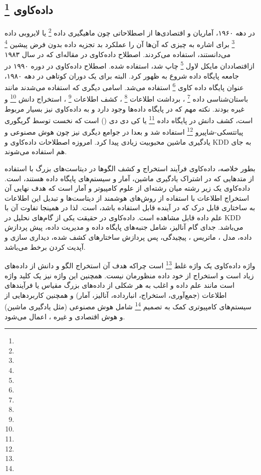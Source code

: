 \documentclass[a4paper, 12pt]{article}
\begin{document}
 \subsection*{داده‌کاوی
\footnote{} 
} 
در دهه ۱۹۶۰، آماریان و اقتصادی‌ها از اصطلاحاتی چون ماهیگیری داده 
\footnote{}
یا لایروبی داده
\footnote{}
برای اشاره به چیزی که آن‌ها آن‌ را عملکرد بد تجزیه داده بدون فرض پیشین
\footnote{}
می‌دانستند، 
استفاده می‌کردند. 
اصطلاح داده‌کاوی در مقاله‌ای که در سال ۱۹۸۳ ازاقتصاددان مایکل لاول 
\footnote{}
 چاپ شد، استفاده شده. 
 اصطلاح داده‌کاوی در دوره ۱۹۹۰ در جامعه پایگاه داده شروع به ظهور کرد. البته برای یک دوران کوتاهی در دهه ۱۹۸۰، عنوان پایگاه داده کاوی 
 \footnote{}
 استفاده می‌شد. اسامی دیگری که استفاده می‌شدند مانند باستان‌شناسی داده
 \footnote{}
 ، 
 برداشت اطلاعات
 \footnote{}
 ،
 کشف اطلاعات
 \footnote{}
،
استخراج دانش 
\footnote{}
و غیره بودند. 
نکته مهم که در پایگاه داده‌ها وجود دارد و به داده‌کاوی نیز بسیار مربوط است، کشف دانش در پایگاه داده 
\footnote{}
یا کی دی دی 
()
است که نخست توسط گریگوری پیاتتسکی-شاپیرو 
\footnote{}
 استفاده شد و بعدا در جوامع دیگری نیز چون هوش مصنوعی و یادگیری ماشین محبوبیت زیادی پیدا کرد. 
امروزه اصطلاحات داده‌کاوی و KDD به جای هم استفاده می‌شوند.

بطور خلاصه، داده‌کاوی فرآیند استخراج و کشف الگوها در دیتاست‌های بزرگ با استفاده از متد‌هایی که در اشتراک یادگیری ماشین، آمار و سیستم‌های پایگاه‌ داده هستند، است. 
داده‌کاوی یک زیر رشته میان رشته‌ای از علوم کامپیوتر و آمار است که هدف نهایی آن استخراج اطلاعات با استفاده از روش‌های هوشمند از دیتاست‌ها و تبدیل این اطلاعات به ساختاری قابل درک که در آینده قابل استفاده باشد، است. لذا در همینجا تفاوت آن با علم داده قابل مشاهده است. داده‌کاوی در حقیقت یکی از گام‌های نحلیل در KDD می‌باشد. جدای گام آنالیز، شامل جنبه‌های پایگاه داده و مدیریت داده، پیش پردازش داده، مدل ،  ماتریس ، پیچیدگی، پس پردازش ساختارهای کشف شده، دیداری سازی و آپدیت کردن برخط می‌باشد.

واژه داده‌کاوی یک واژه غلط 
\footnote{}
است چراکه هدف آن استخراج الگو و دانش از داده‌های زیاد است و استخراج از خود داده منظورمان نیست.  همچنین این واژه نیز یک کلید واژه است مانند علم داده و اغلب به هر شکلی از داده‌های بزرگ مقیاس یا فرآیند‌های اطلاعات (جمع‌آوری، استخراج، انبارداده، آنالیز، آمار) و همچنین کاربرد‌هایی از سیستم‌های کامپیوتری کمک به تصمیم
\footnote{}
شامل هوش مصنوعی (مثل یادگیری ماشین) و هوش اقتصادی و غیره ، اعمال می‌شود.
\end{document}
